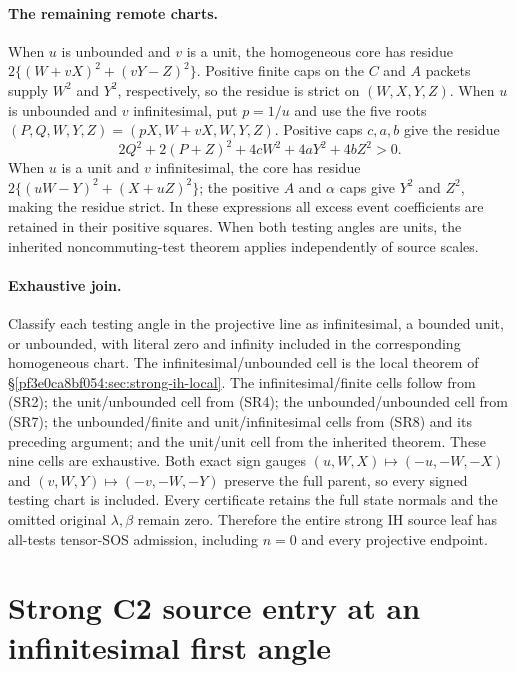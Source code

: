 \paragraph{The remaining remote charts.}
When $u$ is unbounded and $v$ is a unit, the homogeneous core has
residue $2\{(W+vX)^2+(vY-Z)^2\}$. Positive finite caps on the $C$
and $A$ packets supply $W^2$ and $Y^2$, respectively, so the residue
is strict on $(W,X,Y,Z)$. When $u$ is unbounded and $v$ infinitesimal,
put $p=1/u$ and use the five roots
$(P,Q,W,Y,Z)=(pX,W+vX,W,Y,Z)$. Positive caps $c,a,b$ give the residue
\[
 2Q^2+2(P+Z)^2+4cW^2+4aY^2+4bZ^2>0.
\tag{SR8}
\]
When $u$ is a unit and $v$ infinitesimal, the core has residue
$2\{(uW-Y)^2+(X+uZ)^2\}$; the positive $A$ and $\alpha$ caps give
$Y^2$ and $Z^2$, making the residue strict. In these expressions all
excess event coefficients are retained in their positive squares.
When both testing angles are units, the inherited noncommuting-test
theorem applies independently of source scales.

\paragraph{Exhaustive join.}
Classify each testing angle in the projective line as infinitesimal,
a bounded unit, or unbounded, with literal zero and infinity included
in the corresponding homogeneous chart. The infinitesimal/unbounded
cell is the local theorem of \S\ref{pf3e0ca8bf054:sec:strong-ih-local}.
The infinitesimal/finite cells follow from (SR2); the unit/unbounded
cell from (SR4); the unbounded/unbounded cell from (SR7); the
unbounded/finite and unit/infinitesimal cells from (SR8) and its
preceding argument; and the unit/unit cell from the inherited theorem.
These nine cells are exhaustive. Both exact sign gauges
$(u,W,X)\mapsto(-u,-W,-X)$ and
$(v,W,Y)\mapsto(-v,-W,-Y)$ preserve the full parent, so every
signed testing chart is included. Every certificate retains the full
state normals and the omitted original $\lambda,\beta$ remain zero.
Therefore the entire strong IH source leaf has all-tests tensor-SOS
admission, including $n=0$ and every projective endpoint.


\section{\texorpdfstring{Strong C2 source entry at an infinitesimal first angle}{Strong C2 source entry at an infinitesimal first angle}}
\label{component:pf5726218aec8}


